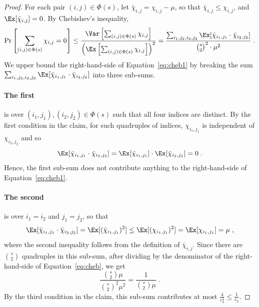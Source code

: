 \begin{proof}
For each pair $(i,j)\in \Phi(s)$,
let $\bar{\chi}_{i,j} = \chi_{i,j} - \mu$, so that $\bar{\chi}_{i,j} \leq \chi_{i,j}$, and
$\Ex[\bar{\chi}_{i,j}] = 0$.
By Chebishev's inequality,
\begin{equation}\label{eq:cheb1}
\Pr\left[\sum_{(i,j)\in \Phi(s)}\chi_{i,j}=0\right] \leq \frac{\Var\left[\sum_{(i,j)\in \Phi(s)} \chi_{i,j}\right]}{\left(\Ex\left[\sum_{(i,j)\in \Phi(s)}\chi_{i,j}\right]\right)^2}
= \frac{\sum_{i_1,j_2,i_2,j_2} \Ex[\bar{\chi}_{i_1,j_1}\cdot \bar{\chi}_{i_2,j_2}]}{{s\choose 2}^2\cdot \mu^2} \;.
\end{equation}
We upper bound the right-hand-side of Equation~\eqref{eq:cheb1} by breaking
 the sum $\sum_{i_1,j_2,i_2,j_2} \Ex[\bar{\chi}_{i_1,j_1}\cdot \bar{\chi}_{i_2,j_2}]$ into three sub-sums.

\paragraph{The first} is over $(i_1,j_1), (i_2,j_2)\in \Phi(s)$ such that all four indices are distinct. By the first condition in the claim, for such quadruples of indices, $\chi_{i_1,j_1}$ is independent of $\chi_{i_2,j_2}$ and so
\begin{equation}\label{eq:cheb-case1}
\Ex[\bar{\chi}_{i_1,j_1}\cdot \bar{\chi}_{i_2,j_2}] =  \Ex[\bar{\chi}_{i_1,j_1}]\cdot \Ex[\bar{\chi}_{i_2,j_2}] = 0\;.
\end{equation}
Hence, the first sub-sum does not contribute anything to the right-hand-side of Equation~\eqref{eq:cheb1}.

\paragraph{The second} is over $i_1 = i_2$ and $j_1 = j_2$, so that
\begin{equation}\label{eq:cheb-case2}
\Ex[\bar{\chi}_{i_1,j_1}\cdot \bar{\chi}_{i_2,j_2}] = \Ex[(\bar{\chi}_{i_1,j_1})^2]
\leq \Ex[(\chi_{i_1,j_1})^2] = \Ex[\chi_{i_1,j_1}] = \mu \;,
\end{equation}
where the second inequality follows from the definition of $\bar{\chi}_{i,j}$.
Since there are ${s\choose 2}$ quadruples in this sub-sum, after dividing by the denominator of the right-hand-side of Equation~\eqref{eq:cheb}, we get
\begin{equation}
\frac{{s\choose 2}\mu}{{s\choose 2}^2\mu^2} = \frac{1}{{s\choose 2} \mu}\;.
\end{equation}
By %
the third condition in the claim,
this sub-sum contributes at most $\frac{4}{c_2^2}\leq \frac{1}{c_2}$.


\end{proof}
